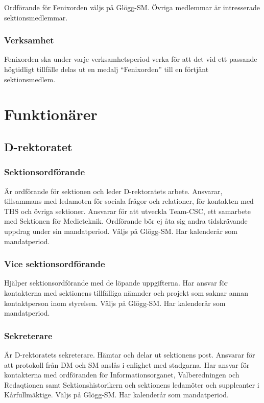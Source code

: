 \documentclass{dgovdoc}
\begin{document}
Ordförande för Fenixorden väljs på Glögg-SM. Övriga medlemmar är intresserade sektionsmedlemmar.

\subsubsection{Verksamhet}

Fenixorden ska under varje verksamhetsperiod verka för att det vid ett passande högtidligt tillfälle delas ut en medalj ``Fenixorden'' till en förtjänt sektionsmedlem.

\section{Funktionärer}

\subsection{D-rektoratet}

\subsubsection{Sektionsordförande}

Är ordförande för sektionen och leder D-rektoratets arbete. Ansvarar, tillsammans med ledamoten för sociala frågor och relationer, för kontakten med THS och övriga sektioner. Ansvarar för att utveckla Team-CSC, ett samarbete med Sektionen för Medieteknik. Ordförande bör ej åta sig andra tidskrävande uppdrag under sin mandatperiod.
Väljs på Glögg-SM. Har kalenderår som mandatperiod.

\subsubsection{Vice sektionsordförande}

Hjälper sektionsordförande med de löpande uppgifterna. Har ansvar för kontakterna med sektionens tillfälliga nämnder och projekt som saknar annan kontaktperson inom styrelsen.
Väljs på Glögg-SM. Har kalenderår som mandatperiod.

\subsubsection{Sekreterare}

Är D-rektoratets sekreterare. Hämtar och delar ut sektionens post. Ansvarar för att protokoll från DM och SM anslås i enlighet med stadgarna. Har ansvar för kontakterna med ordföranden för Informationsorganet, Valberedningen och Redaqtionen samt Sektionshistorikern och sektionens ledamöter och suppleanter i Kårfullmäktige.
Väljs på Glögg-SM. Har kalenderår som mandatperiod.
\end{document}
